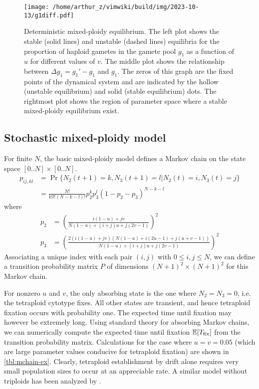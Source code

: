 \documentclass[11pt,a4paper]{article}
\begin{document}
\begin{figure}
\centering
\texttt{[image: /home/arthur\_z/vimwiki/build/img/2023-10-13/g1diff.pdf]}
\caption{
Deterministic mixed-ploidy equilibrium. The left plot shows the stable (solid
lines) and unstable (dashed lines) equilibria for the proportion of haploid
gametes in the gamete pool $g_1$ as a function of $u$ for different values of
$v$. The middle plot shows the relationship between $\Delta g_1 = g_1' - g_1$
and $g_1$. The zeros of this graph are the fixed points of the dynamical system
and are indicated by the hollow (unstable equilibrium) and solid (stable
equilibrium) dots. The rightmost plot shows the region of parameter space where
a stable mixed-ploidy equilibrium exist.
\label{fig:g1diff}}
\end{figure}

\subsection{Stochastic mixed-ploidy model \label{sec:mchain}}

For finite $N$, the basic mixed-ploidy model defines a Markov chain on the
state space $[0..N] \times [0..N]$.
\begin{align}
  p_{ij,kl} &= \Pr\{N_2(t+1)=k, N_3(t+1)=l | N_2(t)=i, N_3(t)=j\} \nonumber \\
    &= \frac{N!}{k!l!(N-k-l)!} p_2^k p_3^l (1-p_2-p_3)^{N-k-l}
\end{align}
where 
\begin{align}
  p_2 &= \left(\frac{i(1-u) + jv}{N(1-u) + (i+j)u + j(2v-1)}\right)^2 \\
  p_3 &= \left(\frac{2(i(1-u) + jv)(N(1-u) + i(2u - 1) + j(u + v - 1))}
    {N(1-u) + (i+j)u + j(2v-1)}\right)^2 
\end{align}
Associating a unique index with each pair $(i,j)$ with $0 \le i,j \le N$, we
can define a transition probability matrix $P$ of dimensions $(N+1)^2 \times
(N+1)^2$ for this Markov chain.

For nonzero $u$ and $v$, the only absorbing state is the one where $N_2 = N_3 =
0$, i.e. the tetraploid cytotype fixes.
All other states are transient, and hence tetraploid fixation occurs with
probability one.
The expected time until fixation may however be extremely long.
Using standard theory for absorbing Markov chains, we can numerically compute
the expected time until fixation $\mathbb{E}[T_{\text{fix}}]$ from the transition
probability matrix.
Calculations for the case where $u=v=0.05$ (which are large parameter values
conducive for tetraploid fixation) are shown in \cref{tbl:mchain-ex}.  Clearly,
tetraploid establishment by drift alone requires very small population sizes to
occur at an appreciable rate.
A similar model without triploids has been analyzed by \cite{rausch2005}.
\end{document}

